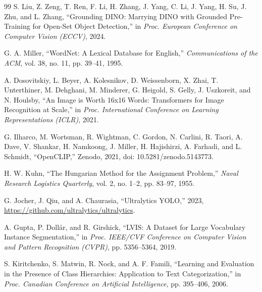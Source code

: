 \begin{thebibliography}{99}
    S. Liu, Z. Zeng, T. Ren, F. Li, H. Zhang, J. Yang, C. Li, J. Yang, H. Su, J. Zhu, and L. Zhang,
    ``Grounding DINO: Marrying DINO with Grounded Pre-Training for Open-Set Object Detection,''
    in {\it Proc. European Conference on Computer Vision (ECCV)}, 2024.

    G. A. Miller,
    ``WordNet: A Lexical Database for English,''
    {\it Communications of the ACM}, vol. 38, no. 11, pp. 39--41, 1995.

    A. Dosovitskiy, L. Beyer, A. Kolesnikov, D. Weissenborn, X. Zhai, T. Unterthiner, M. Dehghani, M. Minderer, G. Heigold, S. Gelly, J. Uszkoreit, and N. Houlsby,
    ``An Image is Worth 16x16 Words: Transformers for Image Recognition at Scale,''
    in {\it Proc. International Conference on Learning Representations (ICLR)}, 2021.

    G. Ilharco, M. Wortsman, R. Wightman, C. Gordon, N. Carlini, R. Taori, A. Dave, V. Shankar, H. Namkoong, J. Miller, H. Hajishirzi, A. Farhadi, and L. Schmidt,
    ``OpenCLIP,''
    Zenodo, 2021, doi: 10.5281/zenodo.5143773.

    H. W. Kuhn,
    ``The Hungarian Method for the Assignment Problem,''
    {\it Naval Research Logistics Quarterly}, vol. 2, no. 1--2, pp. 83--97, 1955.

    G. Jocher, J. Qiu, and A. Chaurasia,
    ``Ultralytics YOLO,''
    2023, \url{https://github.com/ultralytics/ultralytics}.

    A. Gupta, P. Doll\'{a}r, and R. Girshick,
    ``LVIS: A Dataset for Large Vocabulary Instance Segmentation,''
    in {\it Proc. IEEE/CVF Conference on Computer Vision and Pattern Recognition (CVPR)}, pp. 5356--5364, 2019.

    S. Kiritchenko, S. Matwin, R. Nock, and A. F. Famili,
    ``Learning and Evaluation in the Presence of Class Hierarchies: Application to Text Categorization,''
    in {\it Proc. Canadian Conference on Artificial Intelligence}, pp. 395--406, 2006.



\end{thebibliography}
